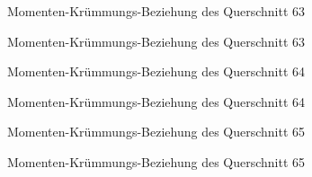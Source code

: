 \documentclass[
  11pt,
  letterpaper,
]{scrreprt}
\begin{document}
\begin{figure}[H]


\caption{\label{fig-qs_63}Momenten-Krümmungs-Beziehung des Querschnitt
63}

\end{figure}%

\begin{figure}[H]


\caption{\label{fig-m_chi_63}Momenten-Krümmungs-Beziehung des
Querschnitt 63}

\end{figure}%

\begin{figure}[H]


\caption{\label{fig-qs_64}Momenten-Krümmungs-Beziehung des Querschnitt
64}

\end{figure}%

\begin{figure}[H]


\caption{\label{fig-m_chi_64}Momenten-Krümmungs-Beziehung des
Querschnitt 64}

\end{figure}%

\begin{figure}[H]


\caption{\label{fig-qs_65}Momenten-Krümmungs-Beziehung des Querschnitt
65}

\end{figure}%

\begin{figure}[H]


\caption{\label{fig-m_chi_65}Momenten-Krümmungs-Beziehung des
Querschnitt 65}

\end{figure}%
\end{document}
